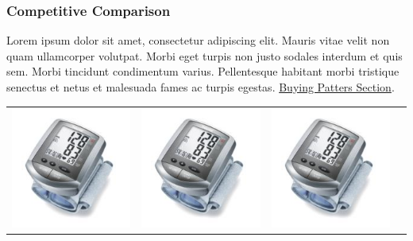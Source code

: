 \documentclass[11pt,a4paper,titlepage]{article}
\begin{document}
\subsubsection{Competitive Comparison}
Lorem ipsum dolor sit amet, consectetur adipiscing elit. Mauris vitae velit 
non quam ullamcorper volutpat. Morbi eget turpis non justo sodales interdum 
et quis sem. Morbi tincidunt condimentum varius. Pellentesque habitant morbi 
tristique senectus et netus et malesuada fames ac turpis egestas.\newline
\hyperlink{competition_and_buying_patterns}{Buying Patters Section}.\newline\newline

\begin{tabular}{| m{92 pt} | m{92 pt} | m{92 pt} | m{92 pt} |}\hline
  \includegraphics[scale=0.40,bb=0 0 150 150]{prod_bpm1.jpg} & 
  \includegraphics[scale=0.40,bb=0 0 150 150]{prod_bpm2.jpg} & 
  \includegraphics[scale=0.40,bb=0 0 150 150]{prod_bpm3.jpg} & 

\end{tabular}
\end{document}
